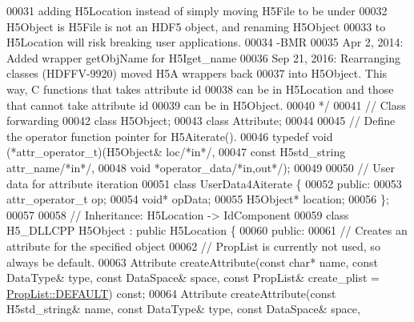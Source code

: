 \begin{DoxyCode}
00031 \textcolor{comment}{                adding H5Location instead of simply moving H5File to be under}
00032 \textcolor{comment}{                H5Object is H5File is not an HDF5 object, and renaming H5Object}
00033 \textcolor{comment}{                to H5Location will risk breaking user applications.}
00034 \textcolor{comment}{                -BMR}
00035 \textcolor{comment}{        Apr 2, 2014: Added wrapper getObjName for H5Iget\_name }
00036 \textcolor{comment}{        Sep 21, 2016: Rearranging classes (HDFFV-9920) moved H5A wrappers back}
00037 \textcolor{comment}{                into H5Object.  This way, C functions that takes attribute id}
00038 \textcolor{comment}{                can be in H5Location and those that cannot take attribute id}
00039 \textcolor{comment}{                can be in H5Object.}
00040 \textcolor{comment}{*/}
00041 \textcolor{comment}{// Class forwarding}
00042 \textcolor{keyword}{class }H5Object;
00043 \textcolor{keyword}{class }Attribute;
00044 
00045 \textcolor{comment}{// Define the operator function pointer for H5Aiterate().}
00046 \textcolor{keyword}{typedef} void (*attr\_operator\_t)(H5Object& loc\textcolor{comment}{/*in*/},
00047                                  \textcolor{keyword}{const} H5std\_string attr\_name\textcolor{comment}{/*in*/},
00048                                  \textcolor{keywordtype}{void} *operator\_data\textcolor{comment}{/*in,out*/});
00049 
00050 \textcolor{comment}{// User data for attribute iteration}
00051 \textcolor{keyword}{class }UserData4Aiterate \{
00052     \textcolor{keyword}{public}:
00053         attr\_operator\_t op;
00054         \textcolor{keywordtype}{void}* opData;
00055         H5Object* location;
00056 \};
00057 
00058 \textcolor{comment}{//  Inheritance: H5Location -> IdComponent}
00059 \textcolor{keyword}{class }H5\_DLLCPP H5Object : \textcolor{keyword}{public} H5Location \{
00060    \textcolor{keyword}{public}:
00061         \textcolor{comment}{// Creates an attribute for the specified object}
00062         \textcolor{comment}{// PropList is currently not used, so always be default.}
00063         Attribute createAttribute(\textcolor{keyword}{const} \textcolor{keywordtype}{char}* name, \textcolor{keyword}{const} DataType& type, \textcolor{keyword}{const} DataSpace& space, \textcolor{keyword}{const} 
      PropList& create\_plist = \hyperlink{class_h5_1_1_prop_list_ae52af66ce82af0ea7e6dc57148c56241}{PropList::DEFAULT}) \textcolor{keyword}{const};
00064         Attribute createAttribute(\textcolor{keyword}{const} H5std\_string& name, \textcolor{keyword}{const} DataType& type, \textcolor{keyword}{const} DataSpace& space, \textcolor{keyword}{
}
\end{DoxyCode}
